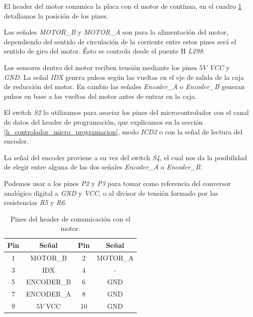 El header del motor comunica la placa con el motor de cont\'inua, en el cuadro \ref{hT_placa_dc_header_motor}
detallamos la posici\'on de los pines.

Las se\~nales \emph{MOTOR\_B} y \emph{MOTOR\_A} son para la alimentaci\'on del motor, dependiendo del sentido
de circulaci\'on de la corriente entre estos pines ser\'a el sentido de giro del motor.
\'Esto se controla desde el puente H \emph{L298}.

Los sensores dentro del motor  reciben tensi\'on mediante los pines \emph{$5V$ VCC} y \emph{GND}.
La se\~nal \emph{IDX} genera pulsos seg\'un las vueltas en el eje de salida de la caja de reducci\'on del
motor.
En cambio las se\~nales \emph{Encoder\_A} o \emph{Encoder\_B} generan pulsos en base a las vueltas del motor
antes de entrar en la caja.

El switch \emph{S2} lo utilizamos para asociar los pines del microcontrolador con el canal de datos del header
de programaci\'on, que explicamos en la secci\'on \ref{h_controlador_micro_programacion}, modo \emph{ICD2} o
con la se\~nal de lectura del encoder.

La se\~nal del encoder proviene a su vez del switch \emph{S4}, el cual nos da la posibilidad de elegir entre
alguna de las dos se\~nales \emph{Encoder\_A} o \emph{Encoder\_B}.

Podemos usar a los pines \emph{P2} y \emph{P3} para tomar como referencia del conversor anal\'ogico digital
a \emph{GND} y \emph{VCC}, o al divisor de tensi\'on formado por las resistencias \emph{R5} y \emph{R6}.

\begin{table}
	\begin{center}
		\begin{tabular}{|c|c|c|c|}
			\hline
			Pin & Se\~nal & Pin & Se\~nal \\
			\hline
			1 & MOTOR\_B & 2 & MOTOR\_A \\
			\hline
			3 & IDX & 4 & - \\
			\hline
			5 & ENCODER\_B & 6 & GND \\
			\hline
			7 & ENCODER\_A & 8 & GND \\
			\hline
			9 & $5V$ VCC & 10 & GND \\
			\hline
		\end{tabular}
		\caption{Pines del header de comunicaci\'on con el motor.}
		\label{hT_placa_dc_header_motor}
	\end{center}
\end{table}

